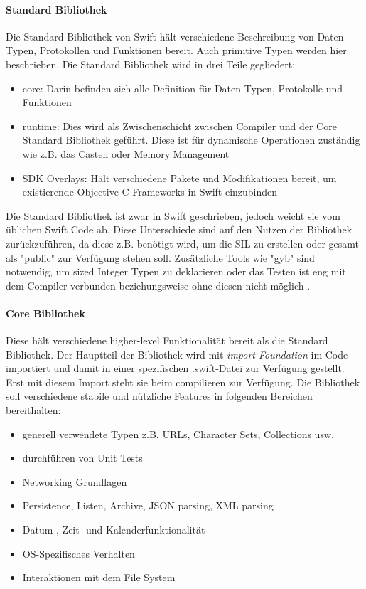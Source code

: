 \paragraph{Standard Bibliothek}
\label{para:standardbibliothek}
Die Standard Bibliothek von Swift hält verschiedene Beschreibung von Daten-Typen, Protokollen und Funktionen bereit. Auch primitive Typen werden hier beschrieben. Die Standard Bibliothek wird in drei Teile gegliedert:
\begin{itemize}
\item core: Darin befinden sich alle Definition für Daten-Typen, Protokolle und Funktionen
\item runtime: Dies wird als Zwischenschicht zwischen Compiler und der Core Standard Bibliothek geführt. Diese ist für dynamische Operationen zuständig wie z.B. das Casten oder Memory Management
\item SDK Overlays: Hält verschiedene Pakete und Modifikationen bereit, um existierende Objective-C Frameworks in Swift einzubinden
\end{itemize}

Die Standard Bibliothek ist zwar in Swift geschrieben, jedoch weicht sie vom üblichen Swift Code ab. Diese Unterschiede sind auf den Nutzen der Bibliothek zurückzuführen, da diese z.B. benötigt wird, um die SIL zu erstellen oder gesamt als "public" zur Verfügung stehen soll. Zusätzliche Tools wie "gyb" sind notwendig, um sized Integer Typen zu deklarieren oder das Testen ist eng mit dem Compiler verbunden beziehungsweise ohne diesen nicht möglich \parencite{swiftbibliothek}.

\paragraph{Core Bibliothek}
Diese hält verschiedene higher-level Funktionalität bereit als die Standard Bibliothek. Der Hauptteil der Bibliothek wird mit \textit{import Foundation} im Code importiert und damit in einer spezifischen .swift-Datei zur Verfügung gestellt. Erst mit diesem Import steht sie beim compilieren zur Verfügung. Die Bibliothek soll verschiedene stabile und nützliche Features in folgenden Bereichen bereithalten:
\begin{itemize}
\item generell verwendete Typen z.B. URLs, Character Sets, Collections usw. 
\item durchführen von Unit Tests
\item Networking Grundlagen
\item Persistence, Listen, Archive, JSON parsing, XML parsing
\item Datum-, Zeit- und Kalenderfunktionalität
\item OS-Spezifisches Verhalten
\item Interaktionen mit dem File System
\end{itemize}

